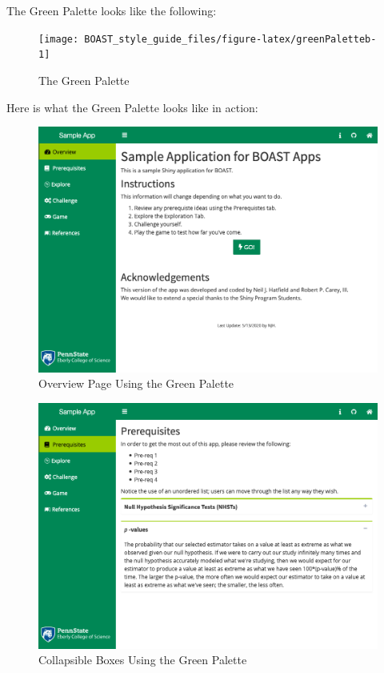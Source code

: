 \documentclass[
]{book}
\begin{document}
The Green Palette looks like the following:

\begin{figure}

{\centering \texttt{[image: BOAST\_style\_guide\_files/figure-latex/greenPaletteb-1]} 

}

\caption{The Green Palette}\label{fig:greenPaletteb}
\end{figure}

Here is what the Green Palette looks like in action:

\begin{figure}

{\centering \includegraphics[width=14in]{images/colorThemes/greenOverview} 

}

\caption{Overview Page Using the Green Palette}\label{fig:greenAction1b}
\end{figure}

\begin{figure}

{\centering \includegraphics[width=14in]{images/colorThemes/greenCollapse} 

}

\caption{Collapsible Boxes Using the Green Palette}\label{fig:greenAction2b}
\end{figure}
\end{document}
